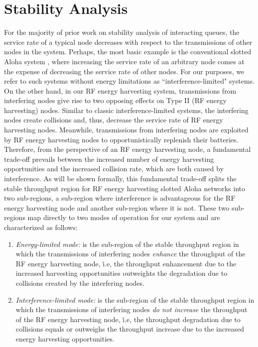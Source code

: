 \documentclass[draftcls,12pt,onecolumn]{IEEEtran}
\begin{document}
\section{Stability Analysis} \label{sec:Stability_Analysis}
For the majority of prior work on stability analysis of interacting queues, the service rate of a typical node decreases with respect to the transmissions of other nodes in the system. Perhaps, the most basic example is the conventional slotted Aloha system \cite{rao1988stability}, where increasing the service rate of an arbitrary node comes at the expense of decreasing the service rate of other nodes. For our purposes, we refer to such systems without energy limitations as ``interference-limited" systems.\\ 
\indent On the other hand, in our RF energy harvesting system, transmissions from interfering nodes give rise to two opposing effects on Type II (RF energy harvesting) nodes. Similar to classic interference-limited systems, the interfering nodes create collisions and, thus, decrease the service rate of RF energy harvesting nodes. Meanwhile, transmissions from interfering nodes are exploited by RF energy harvesting nodes to opportunistically replenish their batteries. Therefore, from the perspective of an RF energy harvesting node, a fundamental trade-off prevails between the increased number of energy harvesting opportunities and the increased collision rate, which are both caused by interference. As will be shown formally, this fundamental trade-off splits the stable throughput region for RF energy harvesting slotted Aloha networks into two sub-regions, a sub-region where interference is advantageous for the RF energy harvesting node and another sub-region where it is not. These two sub-regions map directly to two modes of operation for our system and are characterized as follows:
\begin{enumerate}
\item \emph{Energy-limited mode:} is the sub-region of the stable throughput region in which the transmissions of interfering nodes \emph{enhance} the throughput of the RF energy harvesting node, \.i.e, the throughput enhancement due to the increased harvesting opportunities outweights the degradation due to collisions created by the interfering nodes.
\item \emph{Interference-limited mode:} is the sub-region of the stable throughput region in which the transmissions of interfering nodes \emph{do not increase} the throughput of the RF energy harvesting node, \.i.e, the throughput degradation due to collisions equals or outweighs the throughput increase due to the increased energy harvesting opportunities.
\end{enumerate} 
\end{document}
